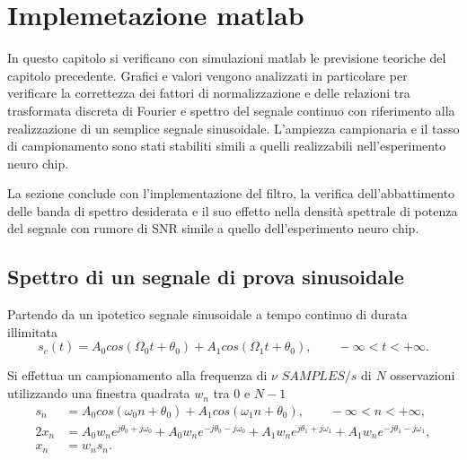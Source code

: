 

\chapter{Implemetazione matlab}
\label{capitolo:matlab}
\graphicspath{{Graph/}}

In questo capitolo si verificano con simulazioni matlab le previsione teoriche del capitolo precedente. Grafici e valori vengono analizzati in particolare per verificare la correttezza dei fattori di normalizzazione e delle relazioni tra trasformata discreta di Fourier e spettro del segnale continuo con riferimento alla realizzazione di un semplice segnale sinusoidale. L'ampiezza campionaria e il tasso di campionamento sono stati stabiliti simili a quelli realizzabili nell'esperimento neuro chip.

La sezione conclude con l'implementazione del filtro, la verifica dell'abbattimento delle banda di spettro desiderata e il suo effetto nella densità spettrale di potenza del segnale con rumore di SNR simile a quello dell'esperimento neuro chip.



\section{Spettro di un segnale di prova sinusoidale}

Partendo da un ipotetico segnale sinusoidale a tempo continuo di durata illimitata
\begin{equation}
s_{c}(t) = A_{0}cos(\Omega_{0}t + \theta_{0}) +A_{1}cos(\Omega_{1}t + \theta_{0}),\quad\quad -\infty< t < +\infty.
\end{equation}

Si effettua un campionamento alla frequenza di $\nu$ $SAMPLES/s$ di $N$ osservazioni utilizzando una finestra quadrata $w_{n}$ tra $0$ e $N-1$
\begin{align*}
s_{n}  &= A_{0}cos(\omega_{0}n + \theta_{0}) +A_{1}cos(\omega_{1}n + \theta_{0}),\quad\quad -\infty< n < +\infty,\\
2x_{n} &= 		  A_{0}w_{n}e^{j\theta_{0}+j\omega_{0}} + A_{0}w_{n}e^{-j\theta_{0}-j\omega_{0}} 
			+ A_{1}w_{n}e^{j\theta_{1}+j\omega_{1}} + A_{1}w_{n}e^{-j\theta_{1}-j\omega_{1}},    \\
x_{n} &= w_{n}s_{n}.
\end{align*}

